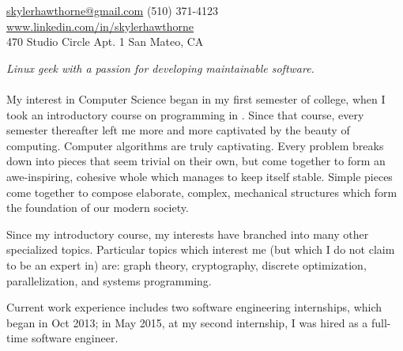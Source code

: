 \documentclass[10pt]{article}
\begin{document}
\sloppy  %



\nobreakvspace{0.3em}  %

\noindent\href{mailto:skyler.hawthorne.at.gmail.dot.com}{skylerhawthorne\mbox{}@\mbox{}gmail.com}\sbull
(510) 371-4123\sbull
\href{http://www.linkedin.com/in/skylerhawthorne}{www.linkedin.com/in/skylerhawthorne}
\\
470 Studio Circle\sbull
Apt. 1\sbull
San Mateo, CA

\spacedhrule{0.9em}{-0.4em}  %


\vspace{-1.3em}  %
\begin{multicols}{2}  %
\noindent \emph{Linux geek with a passion for developing maintainable software.}
\\
\\
My interest in Computer Science began in my first semester of college, when I took an introductory course on programming in \CPP. Since that course, every semester thereafter left me more and more captivated by the beauty of computing. Computer algorithms are truly captivating. Every problem breaks down into pieces that seem trivial on their own, but come together to form an awe-inspiring, cohesive whole which manages to keep itself stable. Simple pieces come together to compose elaborate, complex, mechanical structures which form the foundation of our modern society.

Since my introductory course, my interests have branched into many other specialized topics. Particular topics which interest me (but which I do not claim to be an expert in) are: graph theory, cryptography, discrete optimization, parallelization, and systems programming.

Current work experience includes two software engineering internships, which began in Oct 2013; in May 2015, at my second internship, I was hired as a full-time software engineer.
\end{multicols}
\end{document}
